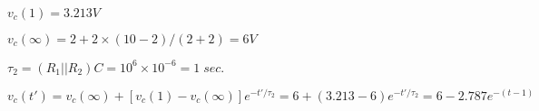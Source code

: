 {\newpage\clearpage
{}%
$v_c(1)=3.213V$%
\lthtmlinlinemathZ
\lthtmlcheckvsize\clearpage}

{\newpage\clearpage
{}%
$v_c(\infty)=2+2\times (10-2)/(2+2)=6V$%
\lthtmlinlinemathZ
\lthtmlcheckvsize\clearpage}

{\newpage\clearpage
{}%
$\tau_2=(R_1||R_2)C=10^6 \times 10^{-6}=1\; sec.$%
\lthtmlinlinemathZ
\lthtmlcheckvsize\clearpage}

{\newpage\clearpage
{}%
\begin{displaymath}	v_c(t')=v_c(\infty)+[v_c(1)-v_c(\infty)]e^{-t'/\tau_2}
   	=6+(3.213-6)e^{-t'/\tau_2}=6-2.787e^{-(t-1)} \end{displaymath}%
\lthtmldisplayZ
\lthtmlcheckvsize\clearpage}



